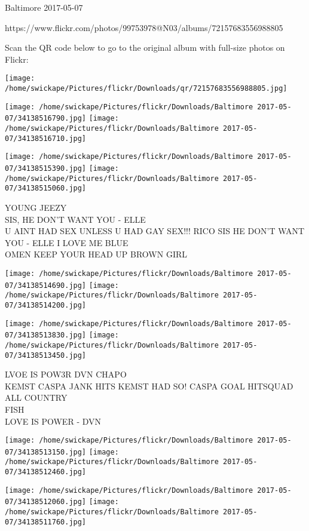 \documentclass[10pt,letterpaper]{article}
\begin{document}
Baltimore 2017-05-07

https://www.flickr.com/photos/99753978@N03/albums/72157683556988805

Scan the QR code below to go to the original album with full-size photos on Flickr:

\texttt{[image: /home/swickape/Pictures/flickr/Downloads/qr/72157683556988805.jpg]}
\pagebreak

\texttt{[image: /home/swickape/Pictures/flickr/Downloads/Baltimore 2017-05-07/34138516790.jpg]}
\texttt{[image: /home/swickape/Pictures/flickr/Downloads/Baltimore 2017-05-07/34138516710.jpg]}

\texttt{[image: /home/swickape/Pictures/flickr/Downloads/Baltimore 2017-05-07/34138515390.jpg]}
\texttt{[image: /home/swickape/Pictures/flickr/Downloads/Baltimore 2017-05-07/34138515060.jpg]}

YOUNG JEEZY\\
SIS, HE DON'T WANT YOU {-} ELLE\\
U AINT HAD SEX UNLESS U HAD GAY SEX!!! RICO SIS HE DON'T WANT YOU {-} ELLE I LOVE ME BLUE\\
OMEN KEEP YOUR HEAD UP BROWN GIRL
\pagebreak

\texttt{[image: /home/swickape/Pictures/flickr/Downloads/Baltimore 2017-05-07/34138514690.jpg]}
\texttt{[image: /home/swickape/Pictures/flickr/Downloads/Baltimore 2017-05-07/34138514200.jpg]}

\texttt{[image: /home/swickape/Pictures/flickr/Downloads/Baltimore 2017-05-07/34138513830.jpg]}
\texttt{[image: /home/swickape/Pictures/flickr/Downloads/Baltimore 2017-05-07/34138513450.jpg]}

LVOE IS POW3R DVN CHAPO\\
KEMST CASPA JANK HITS KEMST HAD SO! CASPA GOAL HITSQUAD ALL COUNTRY\\
FISH\\
LOVE IS POWER {-} DVN
\pagebreak

\texttt{[image: /home/swickape/Pictures/flickr/Downloads/Baltimore 2017-05-07/34138513150.jpg]}
\texttt{[image: /home/swickape/Pictures/flickr/Downloads/Baltimore 2017-05-07/34138512460.jpg]}

\texttt{[image: /home/swickape/Pictures/flickr/Downloads/Baltimore 2017-05-07/34138512060.jpg]}
\texttt{[image: /home/swickape/Pictures/flickr/Downloads/Baltimore 2017-05-07/34138511760.jpg]}
\end{document}
